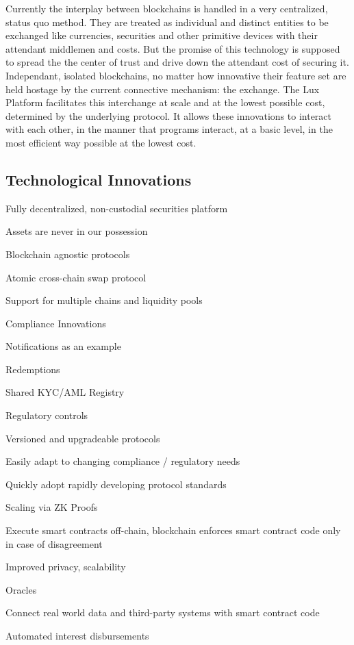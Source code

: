 \documentclass[11pt]{article}
\begin{document}
Currently the interplay between blockchains is handled in a very centralized, status quo method.  They are treated as individual and distinct entities to be exchanged like currencies, securities and other primitive devices with their attendant middlemen and costs. But the promise of this technology is supposed to spread the the center of trust and drive down the attendant cost of securing it. Independant, isolated blockchains, no matter how innovative their feature set are held hostage by the current connective mechanism: the exchange. The Lux Platform facilitates this interchange at scale and at the lowest possible cost, determined by the underlying protocol. It allows these innovations to interact with each other, in the manner that programs interact, at a basic level, in the most efficient way possible at the lowest cost.


\subsection{Technological Innovations}

Fully decentralized, non-custodial securities platform


Assets are never in our possession


Blockchain agnostic protocols


Atomic cross-chain swap protocol


Support for multiple chains and liquidity pools


Compliance Innovations


Notifications as an example


Redemptions


Shared  KYC/AML Registry


Regulatory controls


Versioned and upgradeable protocols


Easily adapt to changing compliance / regulatory needs


Quickly adopt rapidly developing protocol standards


Scaling via ZK Proofs


Execute smart contracts off-chain, blockchain enforces smart contract code only in case of disagreement


Improved privacy, scalability


Oracles


Connect real world data and third-party systems with smart contract code


Automated interest disbursements
\end{document}
